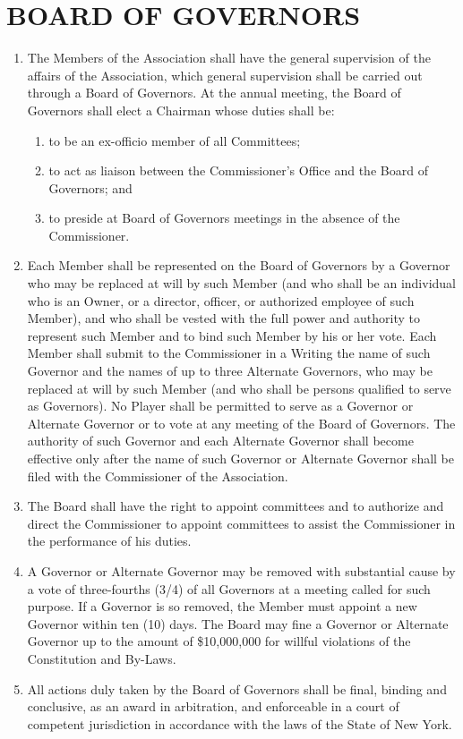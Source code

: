 \documentclass[]{book}
\providecommand{\tightlist}{%
  \setlength{\itemsep}{0pt}\setlength{\parskip}{0pt}}
\begin{document}
\hypertarget{board-of-governors}{%
\section{BOARD OF GOVERNORS}\label{board-of-governors}}

\begin{enumerate}
\def\labelenumi{(\alph{enumi})}
\tightlist
\item
  The Members of the Association shall have the general supervision of the affairs of the Association, which general supervision shall be carried out through a Board of Governors. At the annual meeting, the Board of Governors shall elect a Chairman whose duties shall be:

  \begin{enumerate}
  \def\labelenumii{(\roman{enumii})}
  \tightlist
  \item
    to be an ex-officio member of all Committees;
  \item
    to act as liaison between the Commissioner's Office and the Board of Governors; and
  \item
    to preside at Board of Governors meetings in the absence of the Commissioner.
  \end{enumerate}
\item
  Each Member shall be represented on the Board of Governors by a Governor who may be replaced at will by such Member (and who shall be an individual who is an Owner, or a director, officer, or authorized employee of such Member), and who shall be vested with the full power and authority to represent such Member and to bind such Member by his or her vote. Each Member shall submit to the Commissioner in a Writing the name of such Governor and the names of up to three Alternate Governors, who may be replaced at will by such Member (and who shall be persons qualified to serve as Governors). No Player shall be permitted to serve as a Governor or Alternate Governor or to vote at any meeting of the Board of Governors. The authority of such Governor and each Alternate Governor shall become effective only after the name of such Governor or Alternate Governor shall be filed with the Commissioner of the Association.
\item
  The Board shall have the right to appoint committees and to authorize and direct the Commissioner to appoint committees to assist the Commissioner in the performance of his duties.
\item
  A Governor or Alternate Governor may be removed with substantial cause by a vote of three-fourths (3/4) of all Governors at a meeting called for such purpose. If a Governor is so removed, the Member must appoint a new Governor within ten (10) days. The Board may fine a Governor or Alternate Governor up to the amount of \$10,000,000 for willful violations of the Constitution and By-Laws.
\item
  All actions duly taken by the Board of Governors shall be final, binding and conclusive, as an award in arbitration, and enforceable in a court of competent jurisdiction in accordance with the laws of the State of New York.
\end{enumerate}
\end{document}
